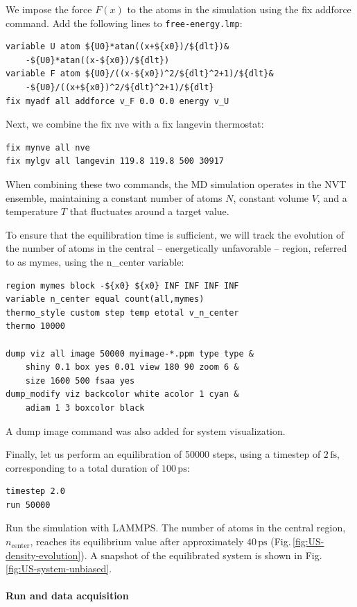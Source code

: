 \documentclass[9pt,tutorial]{livecoms}
\newcommand{\lmpcmd}[1]{\hspace{0pt}\colorbox{listing}{\textcolor{command}{\small{#1}}}\hspace{0pt}} %
\newcommand{\flecmd}[1]{\textcolor{command}{\texttt{#1}}} %
\begin{document}
We impose the force $F(x)$ to the atoms in the simulation
using the \lmpcmd{fix addforce} command.  Add the following
lines to \flecmd{free-energy.lmp}:
\begin{lstlisting}
variable U atom ${U0}*atan((x+${x0})/${dlt})&
    -${U0}*atan((x-${x0})/${dlt})
variable F atom ${U0}/((x-${x0})^2/${dlt}^2+1)/${dlt}&
    -${U0}/((x+${x0})^2/${dlt}^2+1)/${dlt}
fix myadf all addforce v_F 0.0 0.0 energy v_U
\end{lstlisting}
Next, we combine the \lmpcmd{fix nve} with a \lmpcmd{fix langevin} thermostat:
\begin{lstlisting}
fix mynve all nve
fix mylgv all langevin 119.8 119.8 500 30917
\end{lstlisting}
When combining these two commands, the MD simulation operates
in the NVT ensemble, maintaining a constant number of
atoms $N$, constant volume $V$, and a temperature $T$ that
fluctuates around a target value.

To ensure that the equilibration time is sufficient, we will track the evolution of
the number of atoms in the central -- energetically unfavorable -- region,
referred to as \lmpcmd{mymes}, using the \lmpcmd{n\_center} variable:
\begin{lstlisting}
region mymes block -${x0} ${x0} INF INF INF INF
variable n_center equal count(all,mymes)
thermo_style custom step temp etotal v_n_center
thermo 10000

dump viz all image 50000 myimage-*.ppm type type &
    shiny 0.1 box yes 0.01 view 180 90 zoom 6 &
    size 1600 500 fsaa yes
dump_modify viz backcolor white acolor 1 cyan &
    adiam 1 3 boxcolor black
\end{lstlisting}
A \lmpcmd{dump image} command was also added for system visualization.

Finally, let us perform an equilibration of 50000 steps,
using a timestep of $2\,\text{fs}$, corresponding to a total duration of $100\,\text{ps}$:
\begin{lstlisting}
timestep 2.0
run 50000
\end{lstlisting}
Run the simulation with LAMMPS.  The number of atoms in the
central region, $n_\mathrm{center}$, reaches
its equilibrium value after approximately $40\,\text{ps}$
(Fig.\,\ref{fig:US-density-evolution}).  A snapshot of the
equilibrated system is shown in Fig.\,\ref{fig:US-system-unbiased}.

\paragraph{Run and data acquisition}
\end{document}
